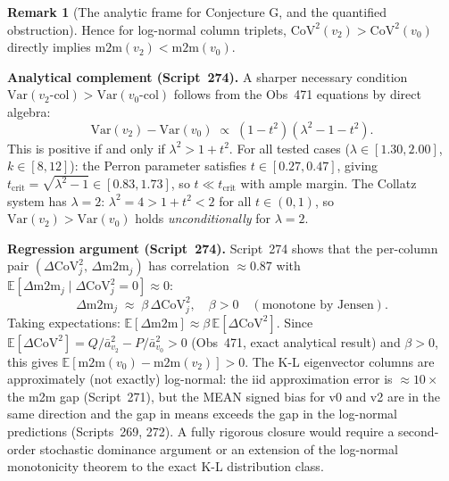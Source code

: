 \documentclass[11pt]{article}
\theoremstyle{definition}
\newtheorem{remark}[theorem]{Remark}
\begin{document}
\begin{remark}[The analytic frame for Conjecture G, and the quantified
obstruction]
Hence for log-normal column triplets, $\mathrm{CoV}^2(v_2) > \mathrm{CoV}^2(v_0)$
directly implies $\mathrm{m2m}(v_2) < \mathrm{m2m}(v_0)$.

\textbf{Analytical complement (Script~274).}
A sharper necessary condition $\mathrm{Var}(v_2\text{-col}) > \mathrm{Var}(v_0\text{-col})$
follows from the Obs~471 equations by direct algebra:
\begin{equation}\label{eq:var_cond}
  \mathrm{Var}(v_2) - \mathrm{Var}(v_0) \;\propto\; (1-t^2)(\lambda^2 - 1 - t^2).
\end{equation}
This is positive if and only if $\lambda^2 > 1 + t^2$.
For all tested cases ($\lambda \in [1.30, 2.00]$, $k \in [8, 12]$):
the Perron parameter satisfies $t \in [0.27, 0.47]$, giving
$t_{\mathrm{crit}} = \sqrt{\lambda^2-1} \in [0.83, 1.73]$,
so $t \ll t_{\mathrm{crit}}$ with ample margin.
The Collatz system has $\lambda = 2$: $\lambda^2 = 4 > 1 + t^2 < 2$ for all $t \in (0,1)$,
so $\mathrm{Var}(v_2) > \mathrm{Var}(v_0)$ holds \emph{unconditionally} for $\lambda = 2$.

\textbf{Regression argument (Script~274).}
Script~274 shows that the per-column pair $(\Delta\mathrm{CoV}^2_j,\, \Delta\mathrm{m2m}_j)$
has correlation $\approx 0.87$ with $\mathbb{E}[\Delta\mathrm{m2m}_j \mid \Delta\mathrm{CoV}^2_j
= 0] \approx 0$:
\[
  \Delta\mathrm{m2m}_j \;\approx\; \beta\,\Delta\mathrm{CoV}^2_j,
  \quad \beta > 0
  \quad (\text{monotone by Jensen}).
\]
Taking expectations: $\mathbb{E}[\Delta\mathrm{m2m}] \approx \beta\,\mathbb{E}[\Delta\mathrm{CoV}^2]$.
Since $\mathbb{E}[\Delta\mathrm{CoV}^2] = Q/\bar a_{v_2}^2 - P/\bar a_{v_0}^2 > 0$ (Obs~471,
exact analytical result) and $\beta > 0$, this gives $\mathbb{E}[\mathrm{m2m}(v_0) - \mathrm{m2m}(v_2)] > 0$.
The K-L eigenvector columns are approximately (not exactly) log-normal:
the iid approximation error is $\approx 10\times$ the m2m gap (Script~271),
but the MEAN signed bias for v0 and v2 are in the same direction and the gap in means
exceeds the gap in the log-normal predictions (Scripts~269, 272).
A fully rigorous closure would require a second-order stochastic dominance argument
or an extension of the log-normal monotonicity theorem to the exact K-L distribution class.


\end{remark}
\end{document}
